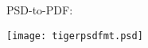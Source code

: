 \documentclass[luatex]{article}%
\begin{document}
\makeatletter
PSD-to-PDF: \@gfxpsd@psdtopdf
\makeatother

\texttt{[image: tigerpsdfmt.psd]}
\end{document}
